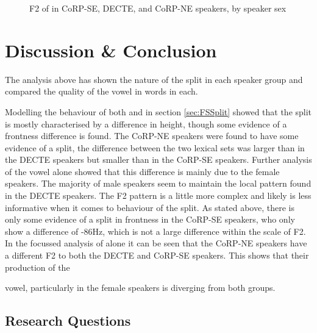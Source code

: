 \documentclass[../../../00.FullDoc/tex/APRReport-year4]{subfiles}
\begin{document}
\begin{figure}[h]
	
	\caption{F2 of \strutt{} in CoRP-SE, DECTE, and CoRP-NE speakers, by speaker sex} \label{fig:strutF2-sex}
\end{figure}

\section{Discussion \& Conclusion}
The analysis above has shown the nature of the \FS{} split in each speaker group and compared the quality of the vowel in \strutt{} words in each.

Modelling the behaviour of both \foot{} and \strutt{} in section \ref{sec:FSSplit} showed that the \FS{} split is mostly characterised by a difference in height, though some evidence of a frontness difference is found. The CoRP-NE speakers were found to have some evidence of a \FS{} split, the difference between the two lexical sets was larger than in the DECTE speakers but smaller than in the CoRP-SE speakers. Further analysis of the \strutt{} vowel alone showed that this difference is mainly due to the female speakers. The majority of male speakers seem to maintain the local pattern found in the DECTE speakers. The F2 pattern is a little more complex and likely is less informative when it comes to behaviour of the \FS{} split. As stated above, there is only some evidence of a split in frontness in the CoRP-SE speakers, who only show a difference of -86Hz, which is not a large difference within the scale of F2. In the focussed analysis of \strutt{} alone it can be seen that the CoRP-NE speakers have a different F2 to both the DECTE and CoRP-SE speakers. This shows that their production of the \strut{} vowel, particularly in the female speakers is diverging from both groups.

\subsection{Research Questions}
\end{document}
